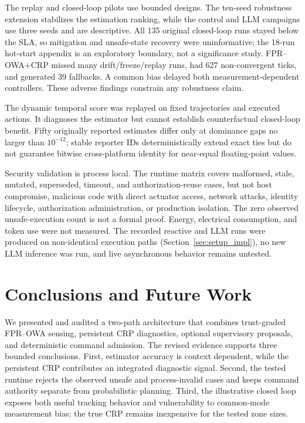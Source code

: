 \documentclass[smartcities,article,submit,moreauthors]{Definitions/mdpi}
\begin{document}
The replay and closed-loop pilots use bounded designs. The ten-seed robustness
extension stabilizes the estimation ranking, while the control and LLM campaigns
use three seeds and are descriptive. All 135 original closed-loop runs stayed
below the SLA, so mitigation and unsafe-state recovery were uninformative;
the 18-run hot-start appendix is an exploratory boundary, not a significance
study. FPR--OWA+CRP missed many drift/freeze/replay runs, had 627
non-convergent ticks, and generated 39 fallbacks. A common bias delayed both
measurement-dependent controllers. These adverse findings constrain any
robustness claim.

The dynamic temporal score was replayed on fixed trajectories and executed
actions. It diagnoses the estimator but cannot establish counterfactual
closed-loop benefit. Fifty originally reported estimates differ only at dominance gaps no
larger than $10^{-12}$; stable reporter IDs deterministically extend exact
ties but do not guarantee bitwise cross-platform identity for near-equal
floating-point values.

Security validation is process local. The runtime matrix covers malformed,
stale, mutated, superseded, timeout, and authorization-reuse cases, but not
host compromise, malicious code with direct actuator access, network attacks,
identity lifecycle, authorization administration, or production isolation.
The zero observed unsafe-execution count is not a formal proof. Energy,
electrical consumption, and token use were not measured. The recorded reactive
and LLM runs were produced on non-identical execution paths
(Section~\ref{sec:setup_impl}), no new LLM inference was run, and live
asynchronous behavior remains untested.

\section{Conclusions and Future Work}
\label{sec:conclusions}

We presented and audited a two-path architecture that combines trust-graded
FPR--OWA sensing, persistent CRP diagnostics, optional supervisory proposals,
and deterministic command admission. The revised evidence supports three
bounded conclusions. First, estimator accuracy is context dependent, while the
persistent CRP contributes an integrated diagnostic signal. Second, the tested
runtime rejects the observed unsafe and process-invalid cases and keeps
command authority separate from probabilistic planning. Third, the illustrative
closed loop exposes both useful tracking behavior and vulnerability to
common-mode measurement bias; the true CRP remains inexpensive for the tested
zone sizes.
\end{document}
